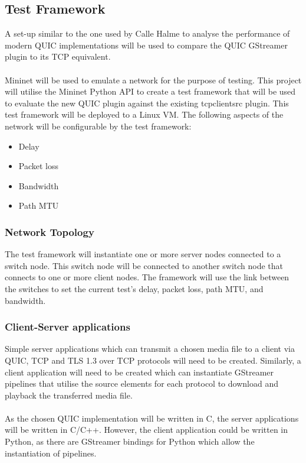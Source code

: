 \documentclass[11pt]{article}
\begin{document}
\subsection{Test Framework}

A set-up similar to the one used by Calle Halme to analyse the performance of modern QUIC implementations\cite{Calle} will be used to compare the QUIC GStreamer plugin to its TCP equivalent.
\\\\
Mininet will be used to emulate a network for the purpose of testing. This project will utilise the Mininet Python API to create a test framework that will be used to evaluate the new QUIC plugin against the existing tcpclientsrc plugin. This test framework will be deployed to a Linux VM. The following aspects of the network will be configurable by the test framework:

\begin{itemize}
    \item Delay
    \item Packet loss
    \item Bandwidth
    \item Path MTU
\end{itemize}

\bigskip
{}

\subsubsection{Network Topology}
The test framework will instantiate one or more server nodes connected to a switch node. This switch node will be connected to another switch node that connects to one or more client nodes. The framework will use the link between the switches to set the current test's delay, packet loss, path MTU, and bandwidth.

\subsubsection{Client-Server applications}

Simple server applications which can transmit a chosen media file to a client via QUIC, TCP and TLS 1.3 over TCP protocols will need to be created. Similarly, a client application will need to be created which can instantiate GStreamer pipelines that utilise the source elements for each protocol to download and playback the transferred media file. \\\\As the chosen QUIC implementation will be written in C, the server applications will be written in C/C++. However, the client application could be written in Python, as there are GStreamer bindings for Python which allow the instantiation of pipelines.
\end{document}
